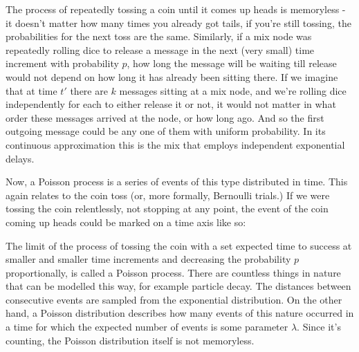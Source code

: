 \documentclass{article}
\begin{document}
\noindent The process of repeatedly tossing a coin until it comes up heads is memoryless - it doesn't matter how many times you already got tails, if you're still tossing, the probabilities for the next toss are the same. Similarly, if a mix node was repeatedly rolling dice to release a message in the next (very small) time increment with probability $p$, how long the message will be waiting till release would not depend on how long it has already been sitting there. If we imagine that at time $t'$ there are $k$ messages sitting at a mix node, and we're rolling dice independently for each to either release it or not, it would not matter in what order these messages arrived at the node, or how long ago. And so the first outgoing message could be any one of them with uniform probability. In its continuous approximation this is the mix that employs independent exponential delays.\medskip

\noindent Now, a Poisson process is a series of events of this type distributed in time. This again relates to the coin toss (or, more formally, Bernoulli trials.) If we were tossing the coin relentlessly, not stopping at any point, the event of the coin coming up heads could be marked on a time axis like so:

\begin{figure}[ht!]
    \centering
\end{figure}

\noindent The limit of the process of tossing the coin with a set expected time to success at smaller and smaller time increments and decreasing the probability $p$ proportionally, is called a Poisson process. There are countless things in nature that can be modelled this way, for example particle decay. The distances between consecutive events are sampled from the exponential distribution. On the other hand, a Poisson distribution describes how many events of this nature occurred in a time for which the expected number of events is some parameter $\lambda$. Since it's counting, the Poisson distribution itself is not memoryless.
\end{document}

